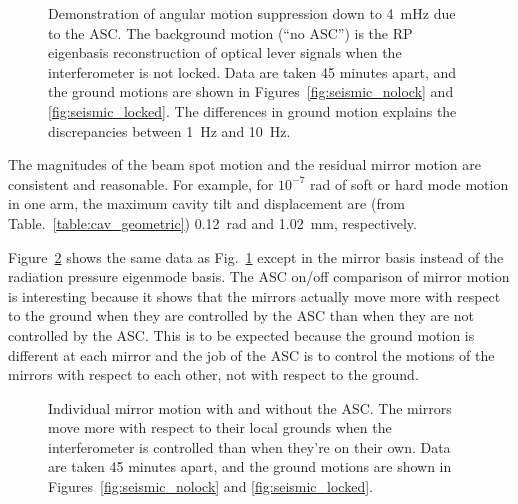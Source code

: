 \begin{figure}
\begin{centering}
\caption[Angular motion suppression due to the ASC]{Demonstration of
  angular motion suppression down to 4~mHz due to the ASC. 
The background motion (``no ASC'') is the RP eigenbasis reconstruction of optical lever signals
  when the interferometer is not locked. Data are taken 45 minutes
  apart, and the ground motions are shown in
  Figures~\ref{fig:seismic_nolock} and \ref{fig:seismic_locked}. The
  differences in ground motion explains the discrepancies between 1~Hz
  and 10~Hz.}
\label{fig:ASConoff}
\end{centering}
\end{figure}

The magnitudes of the beam spot motion and the residual mirror motion
are consistent and reasonable. For example, for $10^{-7}$ rad of soft
or hard mode motion in one arm, the maximum cavity tilt and
displacement are (from Table.~\ref{table:cav_geometric})
0.12~\micro rad and 1.02~mm, respectively.


Figure~\ref{fig:mirror_onoff} shows the same data as
Fig.~\ref{fig:ASConoff} except in the mirror basis instead of the
radiation pressure eigenmode basis. The ASC on/off comparison of
mirror motion is interesting because it shows that the mirrors
actually move more with respect to the ground when they are controlled
by the ASC than when they are not controlled by the ASC. This is to be
expected because the ground motion is different at each mirror and the
job of the ASC is to control the motions of the mirrors with respect
to each other, not with respect to the ground.

\begin{figure}
\begin{centering}
\caption[Individual mirror motion with and without ASC]{Individual
  mirror motion with and without the ASC. The mirrors move more with
  respect to their local grounds when the interferometer is controlled
  than when they're on their own. Data are taken 45 minutes apart, and the ground
  motions are shown in Figures~\ref{fig:seismic_nolock} and
  \ref{fig:seismic_locked}.}
\label{fig:mirror_onoff}
\end{centering}
\end{figure}



